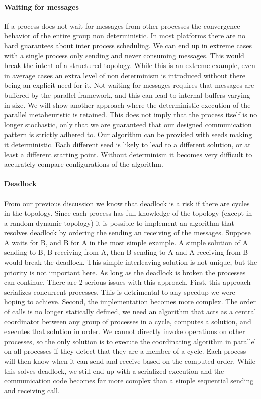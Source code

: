 \paragraph{Waiting for messages}
If a process does not wait for messages from other processes the convergence behavior of the entire group non deterministic. In most platforms there are no hard guarantees about inter process scheduling. We can end up in extreme cases with a single process only sending and never consuming messages. This would break the intent of a structured topology. While this is an extreme example, even in average cases an extra level of non determinism is introduced without there being an explicit need for it. Not waiting for messages requires that messages are buffered by the parallel framework, and this can lead to internal buffers varying in size.  We will show another approach where the deterministic execution of the parallel metaheuristic is retained. This does not imply that the process itself is no longer stochastic, only that we are guaranteed that our designed communication pattern is strictly adhered to. Our algorithm can be provided with seeds making it deterministic. Each different seed is likely to lead to a different solution, or at least a different starting point. Without determinism it becomes very difficult to accurately compare configurations of the algorithm.

\paragraph{Deadlock}
From our previous discussion we know that deadlock is a risk if there are cycles in the topology. Since each process has full knowledge of the topology (except in a random dynamic topology) it is possible to implement an algorithm that resolves deadlock by ordering the sending an receiving of the messages. Suppose A waits for B, and B for A in the most simple example. A simple solution of A sending to B, B receiving from A, then B sending to A and A receiving from B would break the deadlock. This simple interleaving solution is not unique, but the priority is not important here. As long as the deadlock is broken the processes can continue. There are 2 serious issues with this approach. First, this approach serializes concurrent processes. This is detrimental to any speedup we were hoping to achieve. Second, the implementation becomes more complex. The order of calls is no longer statically defined, we need an algorithm that acts as a central coordinator between any group of processes in a cycle, computes a solution, and executes that solution in order. We cannot directly invoke operations on other processes, so the only solution is to execute the coordinating algorithm in parallel on all processes if they detect that they are a member of a cycle. Each process will then know when it can send and receive based on the computed order. While this solves deadlock, we still end up with a serialized execution and the communication code becomes far more complex than a simple sequential sending and receiving call.

